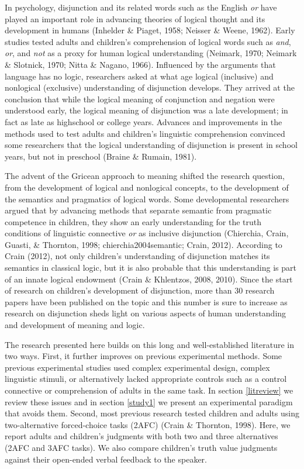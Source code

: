 \documentclass[floatsintext,man]{apa6}
\theoremstyle{definition}
\theoremstyle{definition}
\theoremstyle{definition}
\theoremstyle{remark}
\begin{document}
In psychology, disjunction and its related words such as the English
\emph{or} have played an important role in advancing theories of logical
thought and its development in humans (Inhelder \& Piaget, 1958; Neisser
\& Weene, 1962). Early studies tested adults and children's
comprehension of logical words such as \emph{and}, \emph{or}, and
\emph{not} as a proxy for human logical understanding (Neimark, 1970;
Neimark \& Slotnick, 1970; Nitta \& Nagano, 1966). Influenced by the
arguments that language has no logic, researchers asked at what age
logical (inclusive) and nonlogical (exclusive) understanding of
disjunction develops. They arrived at the conclusion that while the
logical meaning of conjunction and negation were understood early, the
logical meaning of disjunction was a late development; in fact as late
as highschool or college years. Advances and improvements in the methods
used to test adults and children's linguistic comprehension convinced
some researchers that the logical understanding of disjunction is
present in school years, but not in preschool (Braine \& Rumain, 1981).

The advent of the Gricean approach to meaning shifted the research
question, from the development of logical and nonlogical concepts, to
the development of the semantics and pragmatics of logical words. Some
developmental researchers argued that by advancing methods that separate
semantic from pragmatic competence in children, they show an early
understanding for the truth conditions of linguistic connective
\emph{or} as inclusive disjunction (Chierchia, Crain, Guasti, \&
Thornton, 1998; chierchia2004semantic; Crain, 2012). According to Crain
(2012), not only children's understanding of disjunction matches its
semantics in classical logic, but it is also probable that this
understanding is part of an innate logical endowment (Crain \&
Khlentzos, 2008, 2010). Since the start of research on children's
development of disjunction, more than 30 research papers have been
published on the topic and this number is sure to increase as research
on disjunction sheds light on various aspects of human understanding and
development of meaning and logic.

The research presented here builds on this long and well-established
literature in two ways. First, it further improves on previous
experimental methods. Some previous experimental studies used complex
experimental design, complex linguistic stimuli, or alternatively lacked
appropriate controls such as a control connective or comprehension of
adults in the same task. In section \ref{litreview} we review these
issues and in section \ref{study1} we present an experimental paradigm
that avoids them. Second, most previous research tested children and
adults using two-alternative forced-choice tasks (2AFC) (Crain \&
Thornton, 1998). Here, we report adults and children's judgments with
both two and three alternatives (2AFC and 3AFC tasks). We also compare
children's truth value judgments against their open-ended verbal
feedback to the speaker.
\end{document}
